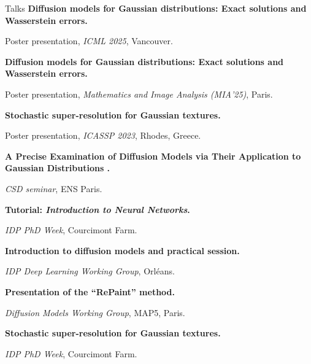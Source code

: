 \begin{rubric}{Talks}
\entry*[July 2025]%
\textbf{Diffusion models for Gaussian distributions: Exact solutions and Wasserstein errors.}
\par Poster presentation, \emph{ICML 2025}, Vancouver.

\entry*[January 2025]%
\textbf{Diffusion models for Gaussian distributions: Exact solutions and Wasserstein errors.}
\par Poster presentation, \emph{Mathematics and Image Analysis (MIA'25)}, Paris.

\entry*[June 2023]%
\textbf{Stochastic super-resolution for Gaussian textures.}
\par Poster presentation, \emph{ICASSP 2023}, Rhodes, Greece.


\entry*[October 2026]%
\textbf{A Precise Examination of Diffusion Models via Their Application to Gaussian Distributions .}
\par \emph{CSD seminar}, ENS Paris.

\entry*[June 2024]%
\textbf{Tutorial: \emph{Introduction to Neural Networks}.}
\par \emph{IDP PhD Week}, Courcimont Farm.

\entry*[June 2023]%
\textbf{Introduction to diffusion models and practical session.}
\par \emph{IDP Deep Learning Working Group}, Orléans.

\entry*[June 2023 ]%
\textbf{Presentation of the “RePaint” method.}
\par \emph{Diffusion Models Working Group}, MAP5, Paris.

\entry*[ June 2023   ]%
\textbf{Stochastic super-resolution for Gaussian textures.}
\par \emph{IDP PhD Week}, Courcimont Farm.

\end{rubric}